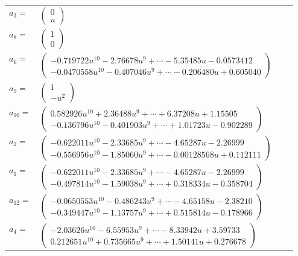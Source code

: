 \documentclass[1p]{elsarticle_modified}
\theoremstyle{definition}
\begin{document}
\begin{tabular}{m{7pt} m{180pt} m{7pt} m{180pt} }
\flushright $a_{3}=$&$\begin{pmatrix}0\\u\end{pmatrix}$ \\
\flushright $a_{8}=$&$\begin{pmatrix}1\\0\end{pmatrix}$ \\
\flushright $a_{6}=$&$\begin{pmatrix}-0.719722 u^{10}-2.76678 u^{9}+\cdots-5.35485 u-0.0573412\\-0.0470558 u^{10}-0.407046 u^{9}+\cdots-0.206480 u+0.605040\end{pmatrix}$ \\
\flushright $a_{9}=$&$\begin{pmatrix}1\\- u^2\end{pmatrix}$ \\
\flushright $a_{10}=$&$\begin{pmatrix}0.582926 u^{10}+2.36488 u^{9}+\cdots+6.37208 u+1.15505\\-0.136796 u^{10}-0.401903 u^{9}+\cdots+1.01723 u-0.902289\end{pmatrix}$ \\
\flushright $a_{2}=$&$\begin{pmatrix}-0.622011 u^{10}-2.33685 u^{9}+\cdots-4.65287 u-2.26999\\-0.556956 u^{10}-1.85060 u^{9}+\cdots-0.00128568 u+0.112111\end{pmatrix}$ \\
\flushright $a_{1}=$&$\begin{pmatrix}-0.622011 u^{10}-2.33685 u^{9}+\cdots-4.65287 u-2.26999\\-0.497814 u^{10}-1.59038 u^{9}+\cdots+0.318334 u-0.358704\end{pmatrix}$ \\
\flushright $a_{12}=$&$\begin{pmatrix}-0.0650553 u^{10}-0.486243 u^{9}+\cdots-4.65158 u-2.38210\\-0.349447 u^{10}-1.13757 u^{9}+\cdots+0.515814 u-0.178966\end{pmatrix}$ \\
\flushright $a_{4}=$&$\begin{pmatrix}-2.03626 u^{10}-6.55953 u^{9}+\cdots-8.33942 u+3.59733\\0.212651 u^{10}+0.735665 u^{9}+\cdots+1.50141 u+0.276678\end{pmatrix}$ \\

\end{tabular}
\end{document}
